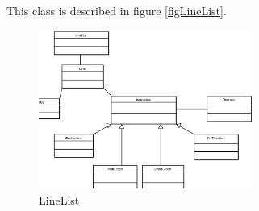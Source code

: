\documentclass{article}
\begin{document}
This class is described in figure \ref{figLineList}.

\begin{figure}
\includegraphics[width=7cm]{linelist.eps}
\caption{LineList}
\label{ gLineList}
\end{figure}
\end{document}
